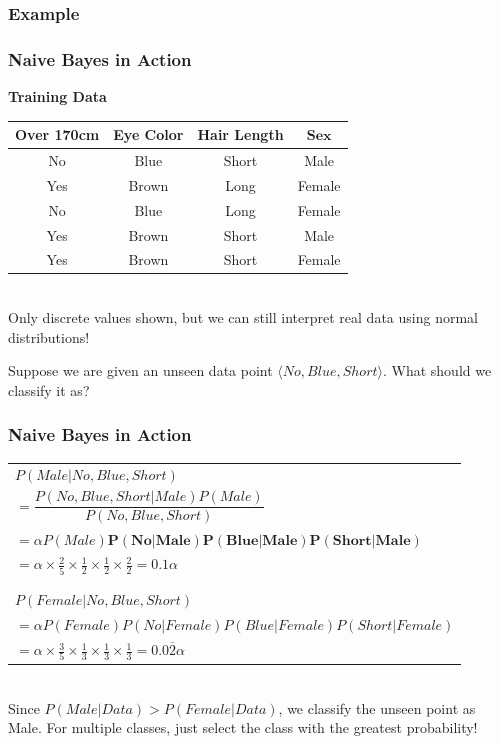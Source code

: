 \documentclass[mathserif]{beamer}
\begin{document}
	\subsubsection{Example}
	\begin{frame}
		\frametitle{Naive Bayes in Action}
		\begin{center} 
			\textbf{Training Data} \\
			\begin{tabular}{c | c | c || c}
				\textbf{Over 170cm} & \textbf{Eye Color} & \textbf{Hair Length} & \(\boxed{\textbf{Sex}}\) \\ \hline \hline
				No & Blue & Short & Male \\ \hline
				Yes & Brown & Long & Female \\ \hline
				No & Blue & Long & Female \\ \hline
				Yes & Brown & Short & Male \\ \hline
				Yes & Brown & Short & Female \\
			\end{tabular}  \\
			\small{Only discrete values shown, but we can still interpret real data using normal distributions!}
		\end{center}
			Suppose we are given an unseen data point \(\langle No, Blue, Short \rangle\). What should we classify it as?
	\end{frame}
	
	\begin{frame}
		\frametitle{Naive Bayes in Action}
		\begin{tabular}{l}
		\(P(Male|No,Blue,Short)\) \\
		\(=\dfrac{P(No,Blue,Short|Male) P(Male)}{P(No,Blue,Short)}\) \\
		\(= \alpha P(Male)\bm{P(No|Male)P(Blue|Male)P(Short|Male)}\) \\
		\(=\alpha \times \frac{2}{5} \times \frac{1}{2} \times \frac{1}{2} \times \frac{2}{2} = \boxed{0.1\alpha}\) \\ \\
		\hline \\
		\(P(Female|No,Blue,Short)\) \\
		\(=\alpha P(Female)P(No|Female)P(Blue|Female)P(Short|Female)\) \\
		\(= \alpha \times \frac{3}{5} \times \frac{1}{3} \times \frac{1}{3} \times \frac{1}{3} = \boxed{0.0\overline{2}\alpha}\) \\
		\end{tabular} \\
		\vspace{10px}
		Since \(P(Male|Data) > P(Female|Data)\), we classify the unseen point as Male. For multiple classes, just select the class with the greatest probability!
	\end{frame} 
	
\end{document}
